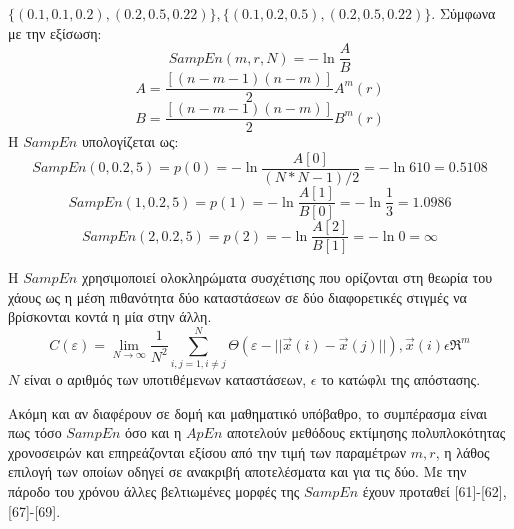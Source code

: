 $\{(0.1, 0.1, 0.2), (0.2, 0.5, 0.22)\}, \{(0.1, 0.2, 0.5), (0.2, 0.5, 0.22)\}$. Σύμφωνα με την εξίσωση: 
\begin{equation}
	SampEn (m, r, N) = - \ln{\frac{A}{B}}
\end{equation}
\begin{equation}
	A = \frac{[(n - m - 1)(n - m)]}{2} A^m (r)
\end{equation}
\begin{equation}
	B = \frac{[(n - m - 1)(n - m)]}{2} B^m (r)
\end{equation}
H $SampEn$ υπολογίζεται ως: 
\begin{equation}
	SampEn (0, 0.2, 5) = p(0) = - \ln{\frac{A[0]}{(N * N - 1)/2}} = - \ln{610} = 0.5108
\end{equation}
\begin{equation}
	SampEn (1, 0.2, 5) = p(1) = - \ln{\frac{A[1]}{B[0]}} = - \ln{\frac{1}{3}} = 1.0986
\end{equation}
\begin{equation}
	SampEn (2, 0.2, 5) = p(2) = - \ln{\frac{A[2]}{B[1]}} = - \ln{0} = \infty
\end{equation}
\par
H $SampEn$ χρησιμοποιεί ολοκληρώματα συσχέτισης που ορίζονται στη θεωρία του χάους ως η μέση πιθανότητα δύο καταστάσεων σε δύο διαφορετικές στιγμές να βρίσκονται κοντά η μία στην άλλη.
\begin{equation}
	C(\varepsilon) = \lim_{N \to \infty} \frac{1}{N^2} \sum_{i, j = 1, i \neq j}^{N} \Theta (\varepsilon - || \overrightarrow x (i) - \overrightarrow x (j)||), \overrightarrow x (i)   \epsilon  \Re^m
\end{equation}
$N$ είναι ο αριθμός των υποτιθέμενων καταστάσεων, $\epsilon$ το κατώφλι της απόστασης.
\par
Ακόμη και αν διαφέρουν σε δομή και μαθηματικό υπόβαθρο, το συμπέρασμα είναι πως τόσο
$SampEn$ όσο και η $ApEn$ αποτελούν μεθόδους εκτίμησης πολυπλοκότητας χρονοσειρών και επηρεάζονται εξίσου από την τιμή των παραμέτρων $m, r$, η λάθος επιλογή των οποίων οδηγεί σε ανακριβή αποτελέσματα και για τις δύο. Με την πάροδο του χρόνου άλλες βελτιωμένες μορφές της $SampEn$ έχουν προταθεί [61]-[62], [67]-[69].
